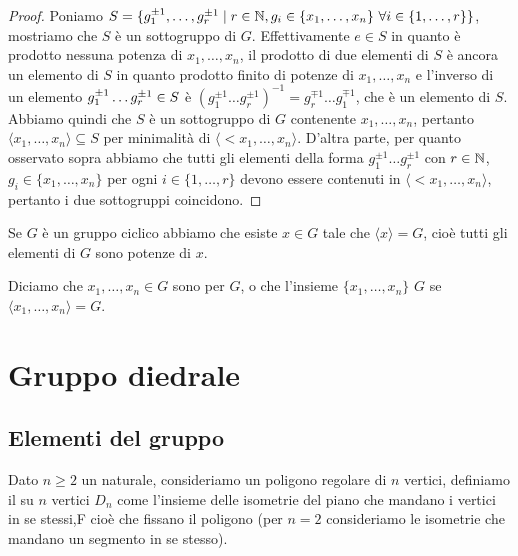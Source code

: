\documentclass[11pt]{scrartcl}
\begin{document}
\begin{proof}
Poniamo $S = \{g_1^{\pm 1}, \ldots, g_r^{\pm 1}\mid r \in \mathbb N, g_i \in \{x_1, \ldots, x_n\}
~\forall i \in \{1, \ldots, r\}\}$, mostriamo che $S$ è un sottogruppo di $G$. 
Effettivamente $e \in S$ in quanto è prodotto nessuna potenza di $x_1, \ldots, x_n$, 
il prodotto di due elementi di $S$ è ancora un elemento di $S$ in quanto
prodotto finito di potenze di $x_1, \ldots, x_n$ e l'inverso di un elemento
$g_1^{\pm 1}\ldots g_r^{\pm 1} \in\nolinebreak S$ è $(g_1^{\pm 1}\ldots 
g_r^{\pm 1})^{-1} = g_r^{\mp 1}\ldots g_1^{\mp 1}$, che è un elemento di $S$.
Abbiamo quindi che $S$ è un sottogruppo di $G$ contenente $x_1, \ldots, x_n$,
pertanto $\langle x_1, \ldots, x_n\rangle\subseteq S$ per minimalità di $\langle <x_1,
\ldots, x_n\rangle$. D'altra parte, per quanto osservato sopra abbiamo che
tutti gli elementi della forma $g_1^{\pm 1}\ldots g_r^{\pm 1}$ con $r \in \mathbb N$, 
$g_i \in \{x_1, \ldots, x_n\}$ per ogni $i \in \{1, \ldots, r\}$ devono essere
contenuti in $\langle <x_1, \ldots, x_n\rangle$, pertanto i due sottogruppi
coincidono.
\end{proof}

\begin{remark}
    Se $G$ è un gruppo ciclico abbiamo che esiste $x \in G$ tale che 
    $\langle x\rangle = G$, cioè tutti gli elementi di $G$ sono potenze di $x$.
\end{remark}

Diciamo che $x_1, \ldots, x_n \in G$ sono  per $G$, o che 
l'insieme $\{x_1, \ldots, x_n\}$  $G$ se $\langle x_1, \ldots, x_n\rangle = G$.



\section{Gruppo diedrale}

\subsection{Elementi del gruppo}

\begin{definition}
    Dato $n \geq 2$ un naturale, consideriamo un poligono regolare di $n$ vertici,
    definiamo il  su $n$ vertici $D_n$ come l'insieme 
    delle isometrie del piano che mandano i vertici in se stessi,F cioè che 
    fissano il poligono (per $n = 2$ consideriamo le isometrie che mandano un 
    segmento in se stesso).
\end{definition}
\end{document}
